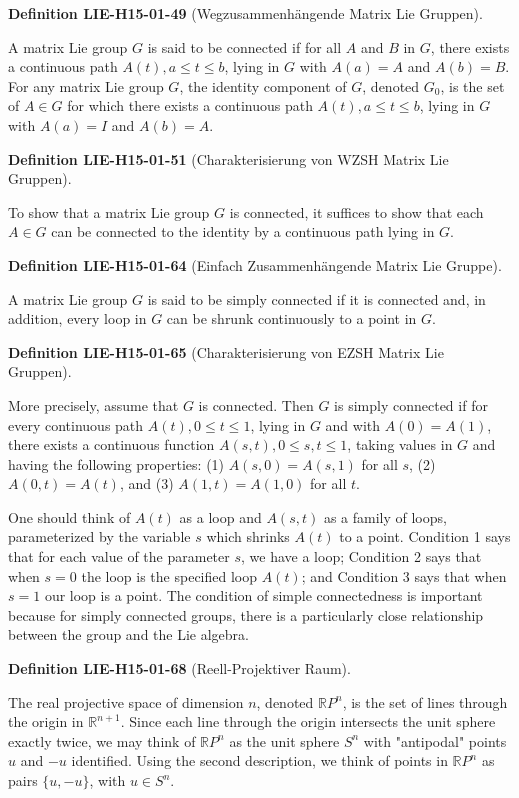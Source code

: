 \documentclass[10pt, letterpaper]{article}
\newcommand{\CustomHeading}[3]{%
  \par\medskip\noindent%
  \textbf{#1 #2} \textnormal{(#3)}.\enskip%
}
\newenvironment{DEF}[2]{\CustomHeading{Definition}{#1}{#2}}{}
\begin{document}
\begin{DEF}{LIE-H15-01-49}{Wegzusammenhängende Matrix Lie Gruppen}
A matrix Lie group $G$ is said to be connected if for all $A$ and $B$ in $G$, there exists a continuous path $A(t), a \leq t \leq b$, lying in $G$ with $A(a)=A$ and $A(b)=B$. For any matrix Lie group $G$, the identity component of $G$, denoted $G_{0}$, is the set of $A \in G$ for which there exists a continuous path $A(t), a \leq t \leq b$, lying in $G$ with $A(a)=I$ and $A(b)=A$.
\end{DEF}

\begin{DEF}{LIE-H15-01-51}{Charakterisierung von WZSH Matrix Lie Gruppen}
To show that a matrix Lie group $G$ is connected, it suffices to show that each $A \in G$ can be connected to the identity by a continuous path lying in $G$.
\end{DEF}

\begin{DEF}{LIE-H15-01-64}{Einfach Zusammenhängende Matrix Lie Gruppe}
A matrix Lie group $G$ is said to be simply connected if it is connected and, in addition, every loop in $G$ can be shrunk continuously to a point in $G$.
\end{DEF}

\begin{DEF}{LIE-H15-01-65}{Charakterisierung von EZSH Matrix Lie Gruppen}
More precisely, assume that $G$ is connected. Then $G$ is simply connected if for every continuous path $A(t), 0 \leq t \leq 1$, lying in $G$ and with $A(0)=A(1)$, there exists a continuous function $A(s, t), 0 \leq s, t \leq 1$, taking values in $G$ and having the following properties: (1) $A(s, 0)=A(s, 1)$ for all $s$, (2) $A(0, t)=A(t)$, and (3) $A(1, t)=A(1,0)$ for all $t$.

One should think of $A(t)$ as a loop and $A(s, t)$ as a family of loops, parameterized by the variable $s$ which shrinks $A(t)$ to a point. Condition 1 says that for each value of the parameter $s$, we have a loop; Condition 2 says that when $s=0$ the loop is the specified loop $A(t)$; and Condition 3 says that when $s=1$ our loop is a point. The condition of simple connectedness is important because for simply connected groups, there is a particularly close relationship between the group and the Lie algebra.
\end{DEF}

\begin{DEF}{LIE-H15-01-68}{Reell-Projektiver Raum}
The real projective space of dimension $n$, denoted $\mathbb{R} P^{n}$, is the set of lines through the origin in $\mathbb{R}^{n+1}$. Since each line through the origin intersects the unit sphere exactly twice, we may think of $\mathbb{R} P^{n}$ as the unit sphere $S^{n}$ with "antipodal" points $u$ and $-u$ identified. Using the second description, we think of points in $\mathbb{R} P^{n}$ as pairs $\{u,-u\}$, with $u \in S^{n}$.
\end{DEF}
\end{document}
